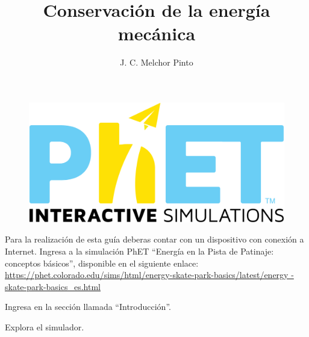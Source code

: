 \documentclass[12pt]{guia}
\title{Conservación de la energía mecánica}
\author{J. C. Melchor Pinto}
\begin{document}
\pagestyle{headandfoot}
\addpoints
\INFO
\begin{opening}
    {
    \vspace{-0.7cm}
    \begin{figure}[H]
        \centering
        \includegraphics[width=.12\linewidth]{../images/phet}
    \end{figure}
    Para la realización de esta guía deberas contar con un dispositivo con
    conexión a Internet. Ingresa a la simulación PhET ``Energía en la Pista de
    Patinaje: conceptos básicos'', disponible en el siguiente enlace: \\
    {
    \small
    \url{https://phet.colorado.edu/sims/html/energy-skate-park-basics/latest/energy
        -skate-park-basics_es.html}
    }\\
    \begin{center}
        \begin{minipage}{0.8\textwidth}
            \begin{minipage}{.1\linewidth}
                \color{colorrds}\huge\faHome
            \end{minipage}%
            \begin{minipage}{.90\linewidth}
                \begin{tcolorbox}[width=\linewidth ,halign=left,colframe=rdsdark,arc=3mm, sharp corners=west]
                    Ingresa en la sección llamada ``Introducción''.\\
                \end{tcolorbox}
            \end{minipage}
        \end{minipage}

        \begin{minipage}{0.8\textwidth}
            \begin{minipage}{.1\linewidth}
                \color{colorrds}\huge\faSearch
            \end{minipage}%
            \begin{minipage}{.9\linewidth}
                \begin{tcolorbox}[width=\linewidth,halign=left,colframe=rdsdark,arc=3mm, sharp corners=west]
                    Explora el simulador.\\
                \end{tcolorbox}
            \end{minipage}
        \end{minipage}


\end{center}}
\end{opening}
\end{document}
